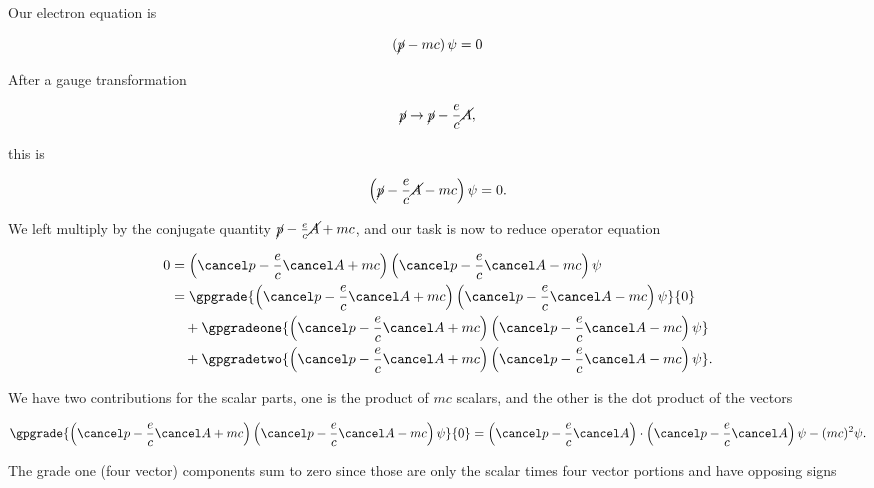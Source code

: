 Our electron equation is

\begin{equation}\label{eqn:diracCovariant:150}
\left(\cancel{p} - m c \right) \psi = 0
\end{equation}

After a gauge transformation

\begin{equation}\label{eqn:diracCovariant:170}
\cancel{p} \rightarrow \cancel{p} - \frac{e}{c} \cancel{A},
\end{equation}

this is

\begin{equation}\label{eqn:diracCovariant:190}
\left(\cancel{p} - \frac{e}{c}\cancel{A} - m c \right) \psi = 0.
\end{equation}

We left multiply by the conjugate quantity $\cancel{p} - \frac{e}{c}\cancel{A} + m c$, and our task is now to reduce operator equation

\begin{equation}\label{eqn:diracCovariant:210}
\begin{aligned}
0 
&= \left(\pslash - \frac{e}{c}\Aslash + m c \right) \left(\pslash - \frac{e}{c}\Aslash - m c \right) \psi \\
&= 
\gpgrade{
\left(\pslash - \frac{e}{c}\Aslash + m c \right) \left(\pslash - \frac{e}{c}\Aslash - m c \right) \psi
}{0} \\
&\quad +\gpgradeone{
\left(\pslash - \frac{e}{c}\Aslash + m c \right) \left(\pslash - \frac{e}{c}\Aslash - m c \right) \psi
} \\
&\quad +\gpgradetwo{
\left(\pslash - \frac{e}{c}\Aslash + m c \right) \left(\pslash - \frac{e}{c}\Aslash - m c \right) \psi
}.
\end{aligned}
\end{equation}

We have two contributions for the scalar parts, one is the product of $mc$ scalars, and the other is the dot product of the vectors

\begin{equation}\label{eqn:diracCovariant:230}
\gpgrade{
\left(\pslash - \frac{e}{c}\Aslash + m c \right) \left(\pslash - \frac{e}{c}\Aslash - m c \right) \psi
}{0}
=
\left(\pslash - \frac{e}{c}\Aslash \right) \cdot \left(\pslash - \frac{e}{c}\Aslash \right) \psi
- (m c)^2 \psi.
\end{equation}

The grade one (four vector) components sum to zero since those are only the scalar times four vector portions and have opposing signs

